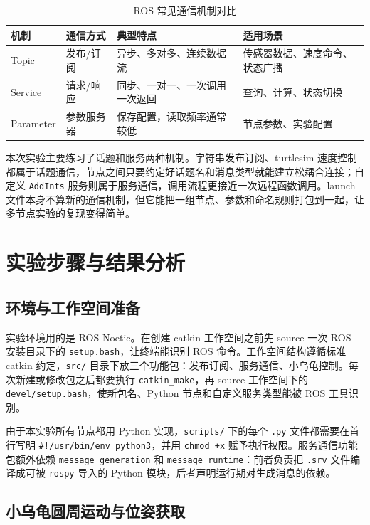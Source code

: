 \documentclass[11pt,a4paper,fontset=fandol]{ctexart}
\begin{document}
\begin{table}[H]
  \centering
  \caption{ROS 常见通信机制对比}
  \begin{tabular}{llll}
    \toprule
    机制 & 通信方式 & 典型特点 & 适用场景 \\
    \midrule
    Topic & 发布/订阅 & 异步、多对多、连续数据流 & 传感器数据、速度命令、状态广播 \\
    Service & 请求/响应 & 同步、一对一、一次调用一次返回 & 查询、计算、状态切换 \\
    Parameter & 参数服务器 & 保存配置，读取频率通常较低 & 节点参数、实验配置 \\
    \bottomrule
  \end{tabular}
  \label{tab:ros-comm}
\end{table}

本次实验主要练习了话题和服务两种机制。字符串发布订阅、turtlesim 速度控制都属于话题通信，节点之间只要约定好话题名和消息类型就能建立松耦合连接；自定义 \verb|AddInts| 服务则属于服务通信，调用流程更接近一次远程函数调用。launch 文件本身不算新的通信机制，但它能把一组节点、参数和命名规则打包到一起，让多节点实验的复现变得简单。

\section{实验步骤与结果分析}

\subsection{环境与工作空间准备}

实验环境用的是 ROS Noetic。在创建 catkin 工作空间之前先 source 一次 ROS 安装目录下的 \verb|setup.bash|，让终端能识别 ROS 命令。工作空间结构遵循标准 catkin 约定，\verb|src/| 目录下放三个功能包：发布订阅、服务通信、小乌龟控制。每次新建或修改包之后都要执行 \verb|catkin_make|，再 source 工作空间下的 \verb|devel/setup.bash|，使新包名、Python 节点和自定义服务类型能被 ROS 工具识别。

由于本实验所有节点都用 Python 实现，\verb|scripts/| 下的每个 \verb|.py| 文件都需要在首行写明 \verb|#!/usr/bin/env python3|，并用 \verb|chmod +x| 赋予执行权限。服务通信功能包额外依赖 \verb|message_generation| 和 \verb|message_runtime|：前者负责把 \verb|.srv| 文件编译成可被 \verb|rospy| 导入的 Python 模块，后者声明运行期对生成消息的依赖。

\subsection{小乌龟圆周运动与位姿获取}
\end{document}

